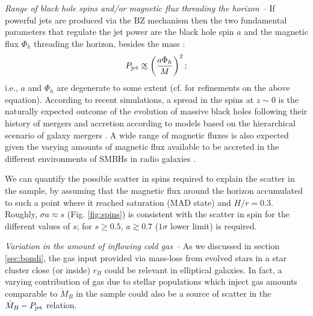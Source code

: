 \documentclass[useAMS,usenatbib]{mn2e}
\def\apropto{%
  \def\p{%
    \setbox0=\vbox{\hbox{$\propto$}}%
    \ht0=0.6ex \box0 }%
  \def\s{%
    \vbox{\hbox{$\sim$}}%
  }%
  \mathrel{\raisebox{0.7ex}{%
      \mbox{$\underset{\s}{\p}$}%
    }}%
}
\begin{document}
\vspace{0.2cm}
\noindent
{\it Range of black hole spins and/or magnetic flux threading the horizon --}
If powerful jets are produced via the BZ mechanism then the two fundamental parameters that regulate the jet power are the black hole spin $a$ and the magnetic flux $\Phi_h$ threading the horizon, besides the mass \citep{Blandford77,Semenov04}:
\begin{equation}
P_{\rm jet} \apropto \left( \frac{a \Phi_h}{M} \right)^2;
\end{equation}
i.e., $a$ and $\Phi_h$ are degenerate to some extent (cf. \citealt{Sasha10} for refinements on the above equation). According to recent simulations, a spread in the spins at $z \sim 0$ is the naturally expected outcome of the evolution of massive black holes following their history of mergers and accretion according to models based on the hierarchical scenario of galaxy mergers \citep{Fanidakis11,Dotti13,Volonteri13}. A wide range of magnetic fluxes is also expected given the varying amounts of magnetic flux available to be accreted in the different environments of SMBHs in radio galaxies \citep{Sikora13}.

We can quantify the possible scatter in spins required to explain the scatter in the sample, by assuming that the magnetic flux around the horizon accumulated to such a point where it reached saturation (MAD state) and $H/r=0.3$. Roughly, $\sigma a \approx s$ (Fig. \ref{fig:spins}) is consistent with the scatter in spin for the different values of $s$; for $s \geq 0.5$, $a \gtrsim 0.7$ ($1\sigma$ lower limit) is required.

\vspace{0.2cm}
\noindent
{\it Variation in the amount of inflowing cold gas --}
As we discussed in section \ref{sec:bondi}, the gas input provided via mass-loss from evolved stars in a star cluster close (or inside) $r_B$ could be relevant in elliptical galaxies. In fact, a varying contribution of gas due to stellar populations which inject gas amounts comparable to $\dot{M}_B$ in the sample could also be a source of scatter in the $\dot{M}_B-P_{\rm jet}$ relation.

\begin{comment}
\subsection{The case of Centaurus A}

WHY IS THE EFFICIENCY FOR CEN A SO HIGH? IS THERE ANYTHING UNUSUAL IN THE X-RAY PROPERTIES OF THIS OBJECT?
Looking more carefully into the data published by Russell+13, I realized that the cavity power remains the same as the one published by Allen+06. However, what really changed is the bondi rate i.e. their density estimate which is 5x lower (compared to allen). 
%
I think I understand the difference. Russell computes the density based on the beta fit, kind of taking into account the fact that the density profile flattens towards Rb. Allen use a power-law model which results in a much bigger estimate for the density as the russell fits indicate.
\end{comment}
\end{document}
